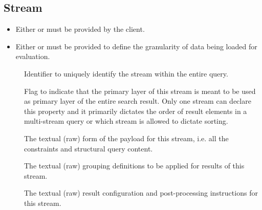 \documentclass[11pt,a4paper]{article}
\begin{document}
\subsection{Stream}
\label{sec:json-ld-stream}
\vspace{-\medskipamount}
\begin{itemize}[leftmargin=*,topsep=0pt]\compresslist
	\item Either  or  must be provided by the client.
	\item Either  or  must be provided to define the granularity of data being loaded for evaluation.
\end{itemize}
\begin{attributes}{}
\end{attributes}
\begin{description}
	\item[] Identifier to uniquely identify the stream within the entire query.
	\item[] Flag to indicate that the primary layer of this stream is meant to be used as primary layer of the entire search result. Only one stream can declare this property and it primarily dictates the order of result elements in a multi-stream query or which stream is allowed to dictate sorting.
	\item[] The textual (raw) form of the payload for this stream, i.e. all the constraints and structural query content.
	\item[] The textual (raw) grouping definitions to be applied for results of this stream.
	\item[] The textual (raw) result configuration and post-processing instructions for this stream.
\end{description}
\end{document}
